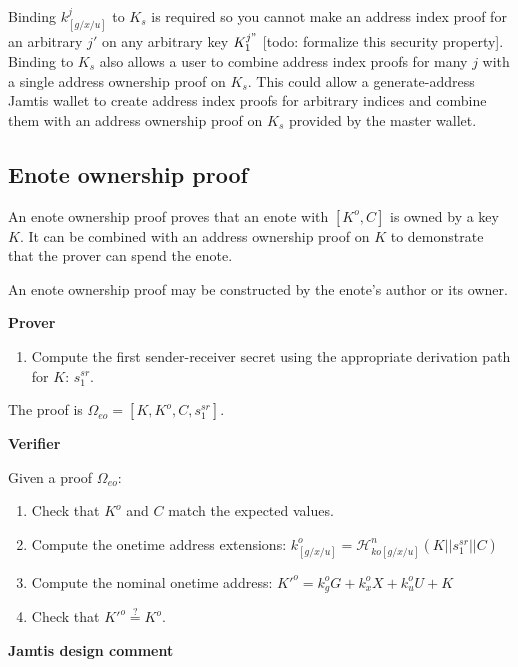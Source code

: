 \begin{appendices}
Binding $k^{j}_{[g/x/u]}$ to $K_s$ is required so you cannot make an address index proof for an arbitrary $j'$ on any arbitrary key $K^{j"}_1$ [todo: formalize this security property]. Binding to $K_s$ also allows a user to combine address index proofs for many $j$ with a single address ownership proof on $K_s$. This could allow a generate-address Jamtis wallet to create address index proofs for arbitrary indices and combine them with an address ownership proof on $K_s$ provided by the master wallet.


\subsection{Enote ownership proof}
\label{appendix:jamtis-information-proofs-enote-ownership}

An enote ownership proof proves that an enote with $[K^o, C]$ is owned by a key $K$. It can be combined with an address ownership proof on $K$ to demonstrate that the prover can spend the enote.

An enote ownership proof may be constructed by the enote's author or its owner.

\textbf{Prover}

\begin{enumerate}
    \item Compute the first sender-receiver secret using the appropriate derivation path for $K$: $s^{sr}_1$.
\end{enumerate}

The proof is $\Omega_{eo} = [K, K^o, C, s^{sr}_1]$.

\textbf{Verifier}

Given a proof $\Omega_{eo}$:

\begin{enumerate}
    \item Check that $K^o$ and $C$ match the expected values.

    \item Compute the onetime address extensions: $k^o_{[g/x/u]} = \mathcal{H}^n_{ko[g/x/u]}(K || s^{sr}_1 || C)$

    \item Compute the nominal onetime address: $K'^o = k^o_g G + k^o_x X + k^o_u U + K$

    \item Check that $K'^o \stackrel{?}{=} K^o$.
\end{enumerate}

\textbf{Jamtis design comment}


\end{appendices}
